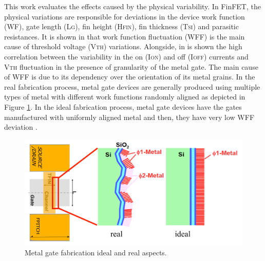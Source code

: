 \documentclass[ecp,tc, english]{iiufrgs}
\begin{document}
\begin{table}[H]
\centering
\caption{Design impact on performance and power due to different types of variability}
\label{tab:02}
\end{table}

This work evaluates the effects caused by the physical variability. In FinFET, the physical variations are responsible for deviations in the device work function (WF), gate length (L\textsc{g}), fin height (H\textsc{fin}), fin thickness (T\textsc{si}) and parasitic resistances. It is shown in \cite{meinhardt2014impact} that work function fluctuation (WFF) is the main cause of threshold voltage (V\textsc{th}) variations. Alongside, in \cite{wang2011statistical} is shown the high correlation between the variability in the on (I\textsc{on}) and off (I\textsc{off}) currents and V\textsc{th} fluctuation in the presence of granularity of the metal gate. The main cause of WFF is due to its dependency over the orientation of its metal grains. In the real fabrication process, metal gate devices are generally produced using multiple types of metal with different work functions randomly aligned as depicted in Figure \ref{wff}. In the ideal fabrication process, metal gate devices have the gates manufactured with uniformly aligned metal and then, they have very low WFF deviation \cite{zimpeck2016finfet}.

\begin{figure}[H]
\centering
\includegraphics[width=\textwidth]{wff.png}
\caption{Metal gate fabrication ideal and real aspects.}
\label{wff}
\end{figure}
\end{document}
